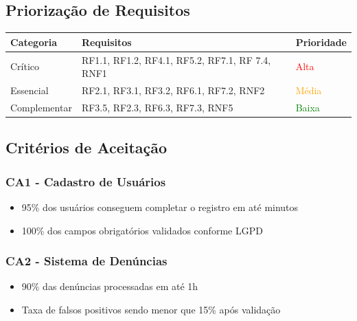 \documentclass[a5paper, 12pt]{article}
\begin{document}
    \subsection{Priorização de Requisitos}
    
        \begin{table}[h]
        \centering
            \begin{tabular}{|l|l|l|}
            \hline
            \textbf{Categoria} & \textbf{Requisitos} & \textbf{Prioridade} \\
            \hline
            \cellcolor Crítico & RF1.1, RF1.2, RF4.1, RF5.2, RF7.1, RF 7.4, RNF1 & \textcolor{red}{Alta} \\
            \hline
            \cellcolor Essencial & RF2.1, RF3.1, RF3.2, RF6.1, RF7.2, RNF2 & \textcolor{orange}{Média} \\
            \hline
            \cellcolor Complementar & RF3.5, RF2.3, RF6.3, RF7.3, RNF5 &   \textcolor{green}{Baixa} \\
            \hline
            \end{tabular}
        \end{table}
    
    \subsection{Critérios de Aceitação}
        \subsubsection{CA1 - Cadastro de Usuários}
            \begin{itemize}
                \item 95\% dos usuários conseguem completar o registro em até minutos
                \item 100\% dos campos obrigatórios validados conforme LGPD
            \end{itemize}
            
        \subsubsection{CA2 - Sistema de Denúncias}
            \begin{itemize}
                \item 90\% das denúncias processadas em até 1h
                \item Taxa de falsos positivos sendo menor que 15\% após validação
            \end{itemize}
            
\end{document}
